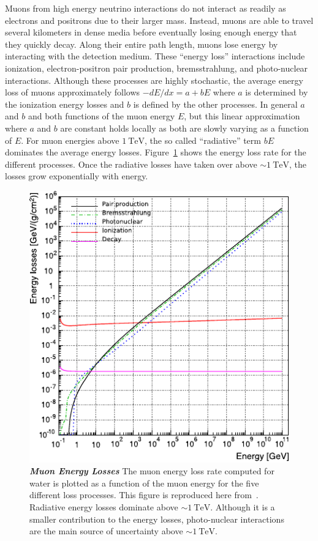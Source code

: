 Muons from high energy neutrino interactions do not interact as readily as electrons and positrons due to their larger mass.
Instead, muons are able to travel several kilometers in dense media before eventually losing enough energy that they quickly decay.
Along their entire path length, muons lose energy by interacting with the detection medium.
These ``energy loss'' interactions include ionization, electron-positron pair production, bremsstrahlung, and photo-nuclear interactions.
Although these processes are highly stochastic, the average energy loss of muons approximately follows $-dE/dx=a+bE$ where $a$ is determined by the ionization energy losses and $b$ is defined by the other processes.
In general $a$ and $b$ and both functions of the muon energy $E$, but this linear approximation where $a$ and $b$ are constant holds locally as both are slowly varying as a function of $E$.
For muon energies above $\SI{1}\TeV$, the so called ``radiative'' term $bE$ dominates the average energy losses.
Figure~\ref{fig:energy_losses} shows the energy loss rate for the different processes.
Once the radiative losses have taken over above $\sim\SI{1}\TeV$, the losses grow exponentially with energy.

\begin{figure}
	\centering
	\includegraphics[width=\linewidth]{figures/energy_losses}
	\internallinenumbers
	\caption{\textbf{\textit{Muon Energy Losses}}
		The muon energy loss rate computed for water is plotted as a function of the muon energy for the five different loss processes.
		This figure is reproduced here from~\cite{Koehne:2013gpa}.
		Radiative energy losses dominate above $\sim\SI{1}\TeV$.
		Although it is a smaller contribution to the energy losses, photo-nuclear interactions are the main source of uncertainty above $\sim\SI{1}\TeV$.
	}\label{fig:energy_losses}
\end{figure}

